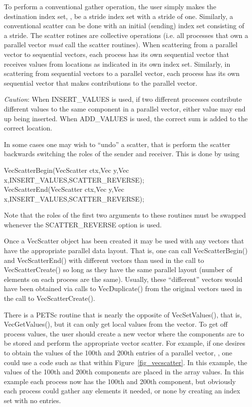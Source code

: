 To perform a conventional gather operation, the user simply makes
 the destination index set, 
, be a stride index set with a stride of one.  Similarly, a 
conventional scatter can be done with an initial (sending) index set 
consisting of a stride.  The scatter rotines are collective operations
(i.e. all processes that own 
a parallel vector {\em must} call the scatter routines). When scattering from a 
parallel vector to sequential vectors, each process has its own sequential 
vector that receives values from locations as indicated in its own 
index set. Similarly, in scattering
from sequential vectors to a parallel vector, each process has its
own sequential vector that makes contributions to the parallel vector.

{\em Caution}: When INSERT_VALUES is used, if two different
processes contribute different values to the same component in a
parallel vector, either value may end up being inserted. When 
ADD_VALUES is used, the correct sum is added to the correct
location.

In some cases one may wish to ``undo'' a scatter, that is perform the 
scatter backwards switching the roles of the sender and receiver. This is 
done by using 
\begin{tabbing}
  VecScatterBegin(VecScatter ctx,Vec y,Vec x,INSERT_VALUES,SCATTER_REVERSE);\\
  VecScatterEnd(VecScatter ctx,Vec y,Vec x,INSERT_VALUES,SCATTER_REVERSE);
\end{tabbing} 
Note that the roles of the first 
two arguments to these routines must be swapped whenever the SCATTER_REVERSE
option is used.

Once a VecScatter object has been created it may be used with any vectors
that have the appropriate parallel data layout. That is, one can call 
VecScatterBegin() and VecScatterEnd() with different vectors than 
used in the call to VecScatterCreate() so long as they have the same 
parallel layout (number of elements on each process are the same). Usually,
these ``different'' vectors would have been obtained via calls to 
VecDuplicate() from the original vectors used in the call to 
VecScatterCreate().

There is a PETSc routine that is nearly the opposite of VecSetValues(), that is, VecGetValues(), but it can only get
local values from the vector. 
To get off process values, the user should create a new vector where
the components are to be stored and perform the appropriate vector 
scatter. For example, if one desires to obtain the values of the 
100th and 200th entries of a parallel vector, , one could use 
a code such as that within Figure~\ref{fig_vecscatter}.
In this example, the values of the 100th and 200th components are
placed in the array 
values. In this example each process now has the 100th and 
200th component, but obviously each process could gather any 
elements it needed, or none by creating an index set with no entries.

